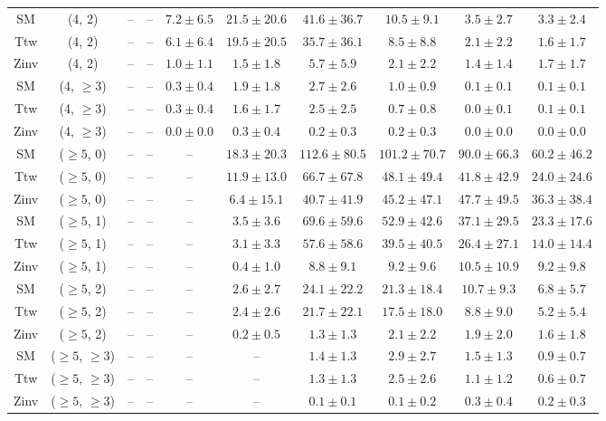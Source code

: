 \begin{table}[h!]
{\begin{tabular}{cccccccccc}
	SM & (4, 2) & -- & -- & $7.2\pm 6.5$ & $21.5\pm 20.6$ & $41.6\pm 36.7$ & $10.5\pm 9.1$ & $3.5\pm 2.7$ & $3.3\pm 2.4$ \\[0.5ex] 
	Ttw & (4, 2) & -- & -- & $6.1\pm 6.4$ & $19.5\pm 20.5$ & $35.7\pm 36.1$ & $8.5\pm 8.8$ & $2.1\pm 2.2$ & $1.6\pm 1.7$ \\[0.5ex] 
	Zinv & (4, 2) & -- & -- & $1.0\pm 1.1$ & $1.5\pm 1.8$ & $5.7\pm 5.9$ & $2.1\pm 2.2$ & $1.4\pm 1.4$ & $1.7\pm 1.7$ \\[0.5ex] 
	SM & (4, $\ge3$) & -- & -- & $0.3\pm 0.4$ & $1.9\pm 1.8$ & $2.7\pm 2.6$ & $1.0\pm 0.9$ & $0.1\pm 0.1$ & $0.1\pm 0.1$ \\[0.5ex] 
	Ttw & (4, $\ge3$) & -- & -- & $0.3\pm 0.4$ & $1.6\pm 1.7$ & $2.5\pm 2.5$ & $0.7\pm 0.8$ & $0.0\pm 0.1$ & $0.1\pm 0.1$ \\[0.5ex] 
	Zinv & (4, $\ge3$) & -- & -- & $0.0\pm 0.0$ & $0.3\pm 0.4$ & $0.2\pm 0.3$ & $0.2\pm 0.3$ & $0.0\pm 0.0$ & $0.0\pm 0.0$ \\[0.5ex] 
	SM & ($\ge5$, 0) & -- & -- & -- & $18.3\pm 20.3$ & $112.6\pm 80.5$ & $101.2\pm 70.7$ & $90.0\pm 66.3$ & $60.2\pm 46.2$ \\[0.5ex] 
	Ttw & ($\ge5$, 0) & -- & -- & -- & $11.9\pm 13.0$ & $66.7\pm 67.8$ & $48.1\pm 49.4$ & $41.8\pm 42.9$ & $24.0\pm 24.6$ \\[0.5ex] 
	Zinv & ($\ge5$, 0) & -- & -- & -- & $6.4\pm 15.1$ & $40.7\pm 41.9$ & $45.2\pm 47.1$ & $47.7\pm 49.5$ & $36.3\pm 38.4$ \\[0.5ex] 
	SM & ($\ge5$, 1) & -- & -- & -- & $3.5\pm 3.6$ & $69.6\pm 59.6$ & $52.9\pm 42.6$ & $37.1\pm 29.5$ & $23.3\pm 17.6$ \\[0.5ex] 
	Ttw & ($\ge5$, 1) & -- & -- & -- & $3.1\pm 3.3$ & $57.6\pm 58.6$ & $39.5\pm 40.5$ & $26.4\pm 27.1$ & $14.0\pm 14.4$ \\[0.5ex] 
	Zinv & ($\ge5$, 1) & -- & -- & -- & $0.4\pm 1.0$ & $8.8\pm 9.1$ & $9.2\pm 9.6$ & $10.5\pm 10.9$ & $9.2\pm 9.8$ \\[0.5ex] 
	SM & ($\ge5$, 2) & -- & -- & -- & $2.6\pm 2.7$ & $24.1\pm 22.2$ & $21.3\pm 18.4$ & $10.7\pm 9.3$ & $6.8\pm 5.7$ \\[0.5ex] 
	Ttw & ($\ge5$, 2) & -- & -- & -- & $2.4\pm 2.6$ & $21.7\pm 22.1$ & $17.5\pm 18.0$ & $8.8\pm 9.0$ & $5.2\pm 5.4$ \\[0.5ex] 
	Zinv & ($\ge5$, 2) & -- & -- & -- & $0.2\pm 0.5$ & $1.3\pm 1.3$ & $2.1\pm 2.2$ & $1.9\pm 2.0$ & $1.6\pm 1.8$ \\[0.5ex] 
	SM & ($\ge5$, $\ge3$) & -- & -- & -- & -- & $1.4\pm 1.3$ & $2.9\pm 2.7$ & $1.5\pm 1.3$ & $0.9\pm 0.7$ \\[0.5ex] 
	Ttw & ($\ge5$, $\ge3$) & -- & -- & -- & -- & $1.3\pm 1.3$ & $2.5\pm 2.6$ & $1.1\pm 1.2$ & $0.6\pm 0.7$ \\[0.5ex] 
	Zinv & ($\ge5$, $\ge3$) & -- & -- & -- & -- & $0.1\pm 0.1$ & $0.1\pm 0.2$ & $0.3\pm 0.4$ & $0.2\pm 0.3$ \\[0.5ex] 
	\hline
	\hline
\end{tabular}}
\end{table}
